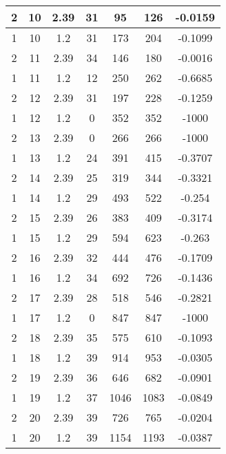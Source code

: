 \documentclass[letterpaper, 12pt]{article}
\begin{document}
\begin{longtable}{|c|c|c|c|c|c|c|}
\hline
2 & 10 & 2.39 & 31 & 95 & 126 & -0.0159 \\
\hline
1 & 10 & 1.2 & 31 & 173 & 204 & -0.1099 \\
\hline
2 & 11 & 2.39 & 34 & 146 & 180 & -0.0016 \\
\hline
1 & 11 & 1.2 & 12 & 250 & 262 & -0.6685 \\
\hline
2 & 12 & 2.39 & 31 & 197 & 228 & -0.1259 \\
\hline
1 & 12 & 1.2 & 0 & 352 & 352 & -1000 \\
\hline
2 & 13 & 2.39 & 0 & 266 & 266 & -1000 \\
\hline
1 & 13 & 1.2 & 24 & 391 & 415 & -0.3707 \\
\hline
2 & 14 & 2.39 & 25 & 319 & 344 & -0.3321 \\
\hline
1 & 14 & 1.2 & 29 & 493 & 522 & -0.254 \\
\hline
2 & 15 & 2.39 & 26 & 383 & 409 & -0.3174 \\
\hline
1 & 15 & 1.2 & 29 & 594 & 623 & -0.263 \\
\hline
2 & 16 & 2.39 & 32 & 444 & 476 & -0.1709 \\
\hline
1 & 16 & 1.2 & 34 & 692 & 726 & -0.1436 \\
\hline
2 & 17 & 2.39 & 28 & 518 & 546 & -0.2821 \\
\hline
1 & 17 & 1.2 & 0 & 847 & 847 & -1000 \\
\hline
2 & 18 & 2.39 & 35 & 575 & 610 & -0.1093 \\
\hline
1 & 18 & 1.2 & 39 & 914 & 953 & -0.0305 \\
\hline
2 & 19 & 2.39 & 36 & 646 & 682 & -0.0901 \\
\hline
1 & 19 & 1.2 & 37 & 1046 & 1083 & -0.0849 \\
\hline
2 & 20 & 2.39 & 39 & 726 & 765 & -0.0204 \\
\hline
1 & 20 & 1.2 & 39 & 1154 & 1193 & -0.0387 \\
\hline
\end{longtable}
\end{document}
